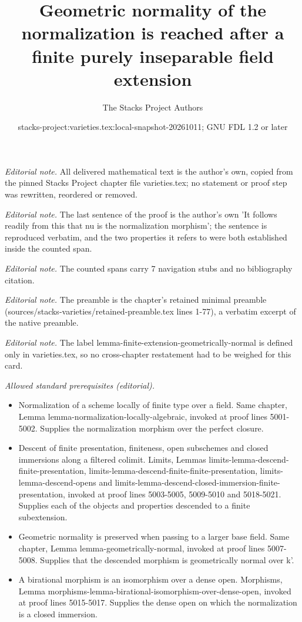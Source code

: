 \documentclass[10pt,a4paper]{amsart}
\title{Geometric normality of the normalization is reached after a finite purely inseparable field extension}
\author{The Stacks Project Authors}
\date{stacks-project:varieties.tex:local-snapshot-20261011; GNU FDL 1.2 or later}
\theoremstyle{plain}
\theoremstyle{definition}
\theoremstyle{remark}
\numberwithin{equation}{subsection}
\begin{document}
\maketitle
\noindent\textit{Editorial note.} All delivered mathematical text is the author's own, copied from the pinned Stacks Project chapter file varieties.tex; no statement or proof step was rewritten, reordered or removed.\par\medskip
\noindent\textit{Editorial note.} The last sentence of the proof is the author's own 'It follows readily from this that nu is the normalization morphism'; the sentence is reproduced verbatim, and the two properties it refers to were both established inside the counted span.\par\medskip
\noindent\textit{Editorial note.} The counted spans carry 7 navigation stubs and no bibliography citation.\par\medskip
\noindent\textit{Editorial note.} The preamble is the chapter's retained minimal preamble (sources/stacks-varieties/retained-preamble.tex lines 1-77), a verbatim excerpt of the native preamble.\par\medskip
\noindent\textit{Editorial note.} The label lemma-finite-extension-geometrically-normal is defined only in varieties.tex, so no cross-chapter restatement had to be weighed for this card.\par\medskip
\noindent\textit{Allowed standard prerequisites (editorial).}\begin{itemize}
\item Normalization of a scheme locally of finite type over a field. Same chapter, Lemma lemma-normalization-locally-algebraic, invoked at proof lines 5001-5002. Supplies the normalization morphism over the perfect closure.
\item Descent of finite presentation, finiteness, open subschemes and closed immersions along a filtered colimit. Limits, Lemmas limits-lemma-descend-finite-presentation, limits-lemma-descend-finite-finite-presentation, limits-lemma-descend-opens and limits-lemma-descend-closed-immersion-finite-presentation, invoked at proof lines 5003-5005, 5009-5010 and 5018-5021. Supplies each of the objects and properties descended to a finite subextension.
\item Geometric normality is preserved when passing to a larger base field. Same chapter, Lemma lemma-geometrically-normal, invoked at proof lines 5007-5008. Supplies that the descended morphism is geometrically normal over k'.
\item A birational morphism is an isomorphism over a dense open. Morphisms, Lemma morphisms-lemma-birational-isomorphism-over-dense-open, invoked at proof lines 5015-5017. Supplies the dense open on which the normalization is a closed immersion.
\end{itemize}\medskip
\end{document}
